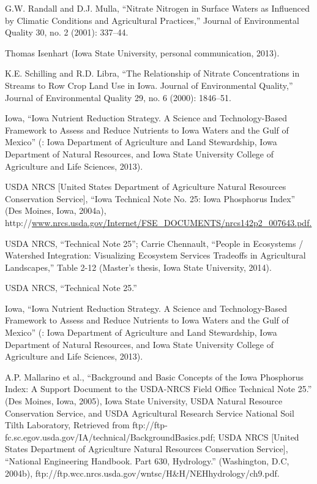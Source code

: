\documentclass[11pt]{article}
\begin{document}
\begin{itemize}
\begin{thebibliography}{1}
   G.W. Randall and D.J. Mulla, “Nitrate Nitrogen in Surface Waters as Influenced by Climatic Conditions and Agricultural Practices,” Journal of Environmental Quality 30, no. 2 (2001): 337–44.
  
   Thomas Isenhart (Iowa State University, personal communication, 2013).
  
   K.E. Schilling and R.D. Libra, “The Relationship of Nitrate Concentrations in Streams to Row Crop Land Use in Iowa. Journal of Environmental Quality,” Journal of Environmental Quality 29, no. 6 (2000): 1846–51.
  
  Iowa, “Iowa Nutrient Reduction Strategy. A Science and Technology-Based Framework to Assess and Reduce Nutrients to Iowa Waters and the Gulf of Mexico” (: Iowa Department of Agriculture and Land Stewardship, Iowa Department of Natural Resources, and Iowa State University College of Agriculture and Life Sciences, 2013).
  
  USDA NRCS [United States Department of Agriculture Natural Resources Conservation Service], “Iowa Technical Note No. 25: Iowa Phosphorus Index” (Des Moines, Iowa, 2004a), http://\url{www.nrcs.usda.gov/Internet/FSE_DOCUMENTS/nrcs142p2_007643.pdf.}
  
  USDA NRCS, “Technical Note 25”;   Carrie Chennault, “People in Ecosystems / Watershed Integration: Visualizing Ecosystem Services Tradeoffs in Agricultural Landscapes,” Table 2-12 (Master’s thesis, Iowa State University, 2014).
  
  USDA NRCS, “Technical Note 25.”
  
  Iowa, “Iowa Nutrient Reduction Strategy. A Science and Technology-Based Framework to Assess and Reduce Nutrients to Iowa Waters and the Gulf of Mexico” (: Iowa Department of Agriculture and Land Stewardship, Iowa Department of Natural Resources, and Iowa State University College of Agriculture and Life Sciences, 2013).
  
  A.P. Mallarino et al., “Background and Basic Concepts of the Iowa Phosphorus Index: A Support Document to the USDA-NRCS Field Office Technical Note 25.” (Des Moines, Iowa, 2005), Iowa State University, USDA Natural Resource Conservation Service, and USDA Agricultural Research Service National Soil Tilth Laboratory, Retrieved from ftp://ftp-fc.sc.egov.usda.gov/IA/technical/BackgroundBasics.pdf; USDA NRCS [United States Department of Agriculture Natural Resources Conservation Service], “National Engineering Handbook. Part 630, Hydrology.” (Washington, D.C, 2004b), ftp://ftp.wcc.nrcs.usda.gov/wntsc/H&H/NEHhydrology/ch9.pdf.
  

\end{thebibliography}
\end{itemize}
\end{document}
